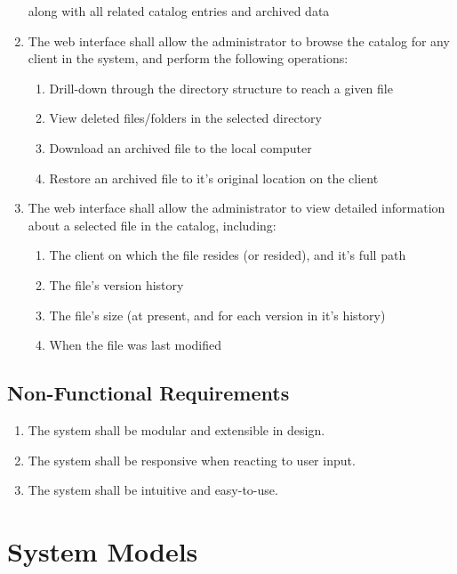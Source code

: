 \begin{enumerate}
        along with all related catalog entries and archived data
    \item The web interface shall allow the administrator to browse the catalog
        for any client in the system, and perform the following operations:
        \begin{enumerate}
            \item Drill-down through the directory structure to reach a given
                file
            \item View deleted files/folders in the selected directory
            \item Download an archived file to the local computer
            \item Restore an archived file to it's original location on the
                client
        \end{enumerate}
    \item The web interface shall allow the administrator to view detailed
        information about a selected file in the catalog, including:
        \begin{enumerate}
            \item The client on which the file resides (or resided), and it's
                full path
            \item The file's version history
            \item The file's size (at present, and for each version in it's
                history)
            \item When the file was last modified
        \end{enumerate}
\end{enumerate}

\subsection{Non-Functional Requirements}

\begin{enumerate}
    \item The system shall be modular and extensible in design.
    \item The system shall be responsive when reacting to user input.
    \item The system shall be intuitive and easy-to-use.
\end{enumerate}

\section{System Models}

